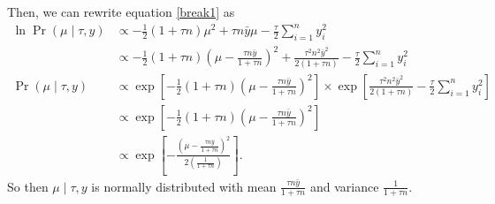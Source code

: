 \documentclass[letterpaper]{amsart}
\begin{document}
Then, we can rewrite equation \ref{break1} as
\begin{align}
    \ln
    \Pr(\mu\mid\tau, y)
    &\propto
    -\frac{1}{2}
    \left(1+\tau n\right) \mu^2
    +\tau n\bar{y}\mu
    -\frac{\tau}{2}
    \sum_{i=1}^n y_i^2
    \\
    &\propto
    -\frac{1}{2}
    \left(1+\tau n\right)
    \left(\mu - \frac{\tau n\bar{y}}{1+\tau n}\right)^2
    +\frac{\tau^2 n^2\bar{y}^2}{2\left(1+\tau n\right)}
    -\frac{\tau}{2}
    \sum_{i=1}^n y_i^2
    \\
    \Pr(\mu\mid\tau, y)
    &\propto
    \exp\left[
    -\frac{1}{2}
    \left(1+\tau n\right)
    \left(\mu - \frac{\tau n\bar{y}}{1+\tau n}\right)^2
    \right]
    \times
    \exp\left[
    \frac{\tau^2 n^2\bar{y}^2}{2\left(1+\tau n\right)}
    -\frac{\tau}{2}
    \sum_{i=1}^n y_i^2
    \right]
    \\
    &\propto
    \exp\left[
    -\frac{1}{2}
    \left(1+\tau n\right)
    \left(\mu - \frac{\tau n\bar{y}}{1+\tau n}\right)^2
    \right]
    \\
    &\propto
    \exp\left[
    -\frac{
    \left(\mu - \frac{\tau n\bar{y}}{1+\tau n}\right)^2
    }{  
    2\left(\frac{1}{1+\tau n}\right)
    }
    \right].
\end{align}
So then $\mu\mid\tau,y$ is normally distributed with mean
$\frac{\tau n\bar{y}}{1+\tau n}$
and variance
$\frac{1}{1+\tau n}$.
\end{document}
